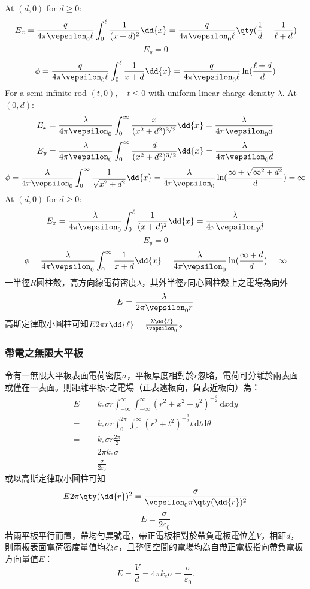 \documentclass[a4paper,12pt]{report}
\begin{document}
\begin{itemize}
At $(d,0)$ for $d\ge0$:
\[E_x=\frac{q}{4\pi\vepsilon_0\ell}\int_0^{\ell}\frac{1}{(x+d)^2}\dd{x}=\frac{q}{4\pi\vepsilon_0\ell}\qty(\frac{1}{d}-\frac{1}{\ell+d})\]
\[E_y=0\]
\[\phi=\frac{q}{4\pi\vepsilon_0\ell}\int_0^{\ell}\frac{1}{x+d}\dd{x}=\frac{q}{4\pi\vepsilon_0\ell}\ln(\frac{\ell+d}{d})\]
For a semi-infinite rod $(t,0),\quad t\le 0$ with uniform linear charge density $\lambda$. At $(0,d)$:
\[E_x=\frac{\lambda}{4\pi\vepsilon_0}\int_0^{\infty}\frac{x}{(x^2+d^2)^{3/2}}\dd{x}=\frac{\lambda}{4\pi\vepsilon_0d}\]
\[E_y=\frac{\lambda}{4\pi\vepsilon_0}\int_0^{\infty}\frac{d}{(x^2+d^2)^{3/2}}\dd{x}=\frac{\lambda}{4\pi\vepsilon_0d}\]
\[\phi=\frac{\lambda}{4\pi\vepsilon_0}\int_0^{\infty}\frac{1}{\sqrt{x^2+d^2}}\dd{x}=\frac{\lambda}{4\pi\vepsilon_0}\ln(\frac{\infty+\sqrt{\infty^2+d^2}}{d})=\infty\]
At $(d,0)$ for $d\ge0$:
\[E_x=\frac{\lambda}{4\pi\vepsilon_0}\int_0^{\ell}\frac{1}{(x+d)^2}\dd{x}=\frac{\lambda}{4\pi\vepsilon_0d}\]
\[E_y=0\]
\[\phi=\frac{\lambda}{4\pi\vepsilon_0}\int_0^{\infty}\frac{1}{x+d}\dd{x}=\frac{\lambda}{4\pi\vepsilon_0}\ln(\frac{\infty+d}{d})=\infty\]
一半徑$R$圓柱殼，高方向線電荷密度$\lambda$，其外半徑$r$同心圓柱殼上之電場為向外
\[E=\frac{\lambda}{2\pi\vepsilon_0r}\]
\bpr
高斯定律取小圓柱可知$E2\pi r\dd{\ell}=\frac{\lambda\dd{\ell}}{\vepsilon_0}$。
\epr
\subsubsection{帶電之無限大平板}
令有一無限大平板表面電荷密度$\sigma$，平板厚度相對於$r$忽略，電荷可分離於兩表面或僅在一表面。則距離平板$r$之電場（正表遠板向，負表近板向）為：
\[\begin{aligned}
E=& k_e\sigma r\int_{-\infty}^\infty\int_{-\infty}^\infty\left(r^2+x^2+y^2\right)^{-\frac{3}{2}}\,\mathrm{d}x\mathrm{d}y\\
=& k_e\sigma r\int_0^{2\pi}\int_0^\infty\left(r^2+t^2\right)^{-\frac{3}{2}}t\,\mathrm{d}t\mathrm{d}\theta\\
=& k_e\sigma r\frac{2\pi}{2}\\
=& 2\pi k_e\sigma\\
=& \frac{\sigma}{2\varepsilon_0}
\end{aligned}\]
或以高斯定律取小圓柱可知
\[E2\pi\qty(\dd{r})^2=\frac{\sigma}{\vepsilon_0\pi\qty(\dd{r})^2}\]
\[E=\frac{\sigma}{2\varepsilon_0}\]
若兩平板平行而置，帶均勻異號電，帶正電板相對於帶負電板電位差$V$，相距$d$，則兩板表面電荷密度量值均為$\sigma$，且整個空間的電場均為自帶正電板指向帶負電板方向量值$E$：
\[E=\frac{V}{d}=4\pi k_e\sigma=\frac{\sigma}{\varepsilon_0}.\]

\end{itemize}
\end{document}
